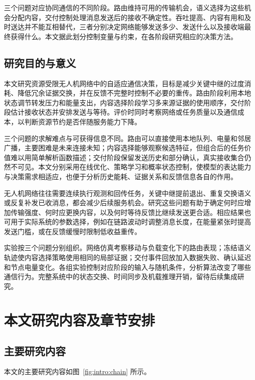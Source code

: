 三个问题对应协同通信的不同阶段。路由维持可用的传输机会，语义选择为这些机会分配内容，交付控制处理消息发送后的接收不确定性。吞吐提高、内容有用和及时送达并不能互相替代，三者分别决定网络能够发送多少、发送什么以及接收端最终获得什么。本文据此划分控制变量与约束，在各阶段研究相应的决策方法。

\subsection{研究目的与意义}

本文研究资源受限无人机网络中的自适应通信决策，目标是减少关键中继的过度消耗、降低冗余证据交换，并在反馈不完整时控制不必要的重传。路由阶段利用本地状态调节转发压力和能量支出，内容选择阶段学习多来源证据的使用顺序，交付阶段估计接收状态并安排发送与等待。评价时同时考察网络或任务质量以及通信成本，以判断资源节约是否伴随服务能力下降。

三个问题的求解难点与可获得信息不同。路由可以直接使用本地队列、电量和邻居广播，主要困难是未来连接未知；内容选择能够观察候选特征，但组合后的任务价值难以用简单解析函数描述；交付阶段保留发送历史和部分确认，真实接收集合仍然不可见。本文分别采用在线优化、策略学习和概率状态控制，使模型的表达能力与决策需求相适应，也便于分析历史能耗、证据关系和反馈信息各自的作用。

无人机网络往往需要连续执行观测和回传任务，关键中继提前退出、重复交换语义或反复补发已收消息，都会减少后续服务机会。研究这些问题有助于确定何时应增加传输强度、何时应更换内容，以及何时等待反馈比继续发送更合适。相应结果也可用于实际系统的参数选择，例如在链路波动时调整消息长度，在能量紧张时提高发送门槛，或在反馈缓慢时限制低收益重传。

实验按三个问题分别组织。网络仿真考察移动与负载变化下的路由表现；冻结语义轨迹使内容选择策略使用相同的局部证据；交付事件回放加入数据失败、确认延迟和节点电量变化。各组实验控制对应阶段的输入与随机条件，分析算法改变了哪些通信行为。完整系统中的状态交换、时间同步及机载推理开销，留待后续集成研究。



\section{本文研究内容及章节安排}
\subsection{主要研究内容}

本文的主要研究内容如图~\ref{fig:intro:chain} 所示。

